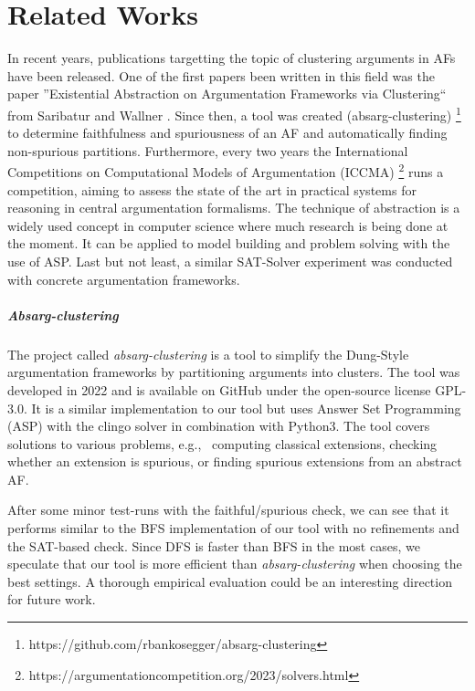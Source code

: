 \chapter{Related Works}
In recent years, publications targetting the topic of clustering arguments in AFs have been released. One of the first papers been written in this field was the paper ''Existential Abstraction on Argumentation Frameworks via Clustering`` from Saribatur and Wallner \cite{DBLP:conf/kr/SaribaturW21}. Since then, a tool was created (absarg-clustering) \footnote{https://github.com/rbankosegger/absarg-clustering} to determine faithfulness and spuriousness of an AF and automatically finding non-spurious partitions. Furthermore, every two years the International Competitions on Computational Models of Argumentation (ICCMA) \footnote{https://argumentationcompetition.org/2023/solvers.html} runs a competition, aiming to assess the state of the art in practical systems for reasoning in central argumentation formalisms. The technique of abstraction is a widely used concept in computer science where much research is being done at the moment. It can be applied to model building and problem solving with the use of ASP. Last but not least, a similar SAT-Solver experiment was conducted with concrete argumentation frameworks.

\paragraph{Absarg-clustering} The project called \emph{absarg-clustering} is a tool to simplify the Dung-Style argumentation frameworks by partitioning arguments into clusters. The tool was developed in 2022 and is available on GitHub under the open-source license GPL-3.0. It is a similar implementation to our tool but uses Answer Set Programming (ASP) with the clingo solver \cite{gebser_et_al:OASIcs.ICLP.2016.2} in combination with Python3. The tool covers solutions to various problems, e.g., \ computing classical extensions, checking whether an extension is spurious, or finding spurious extensions from an abstract AF.

After some minor test-runs with the faithful/spurious check, we can see that it performs similar to the BFS implementation of our tool with no refinements and the SAT-based check. Since DFS is faster than BFS in the most cases, we speculate that our tool is more efficient than \emph{absarg-clustering} when choosing the best settings.
A thorough empirical evaluation could be an interesting direction for future work.

